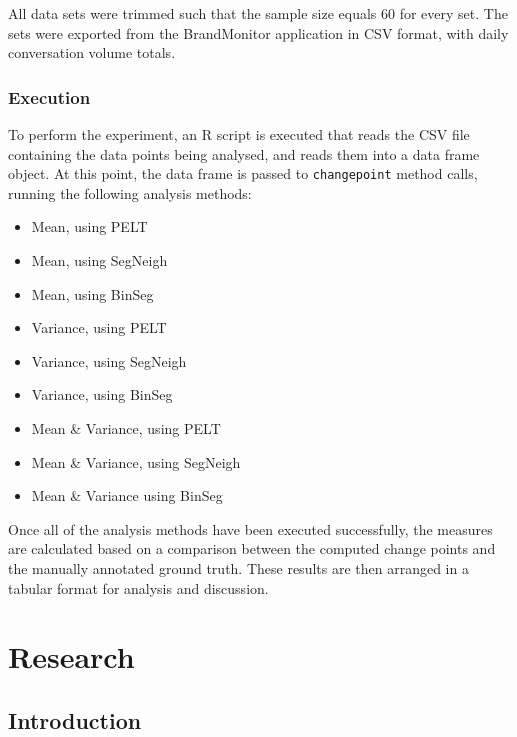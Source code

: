 \documentclass{uvamscse}	%
\begin{document}
All data sets were trimmed such that the sample size equals 60 for every set. The sets were exported from the BrandMonitor application in CSV format, with daily conversation volume totals.

\subsection{Execution}

To perform the experiment, an \textsf{R} script is executed that reads the CSV file containing the data points being analysed, and reads them into a data frame object. At this point, the data frame is passed to \texttt{changepoint} method calls, running the following analysis methods:

\begin{itemize}
    \item Mean, using PELT
    \item Mean, using SegNeigh
    \item Mean, using BinSeg
    \item Variance, using PELT
    \item Variance, using SegNeigh
    \item Variance, using BinSeg
    \item Mean \& Variance, using PELT
    \item Mean \& Variance, using SegNeigh
    \item Mean \& Variance using BinSeg
\end{itemize}

Once all of the analysis methods have been executed successfully, the measures are calculated based on a comparison between the computed change points and the manually annotated ground truth. These results are then arranged in a tabular format for analysis and discussion.








\chapter{Research}

\section{Introduction}
\end{document}
